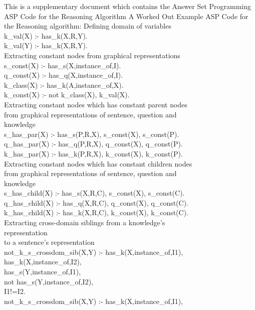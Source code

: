 \label{AppendixA}
This is a supplementary document which contains the Answer Set Programming
ASP Code for the Reasoning Algorithm
A Worked Out Example
ASP Code for the Reasoning algorithm:
Defining domain of variables\\
k\_val(X) :- has\_k(X,R,Y).\\
k\_val(Y) :- has\_k(X,R,Y).\\
Extracting constant nodes from graphical representations\\
s\_const(X) :- has\_s(X,instance\_of,I).\\
q\_const(X) :- has\_q(X,instance\_of,I).\\
k\_class(X) :- has\_k(A,instance\_of,X).\\
k\_const(X) :- not k\_class(X), k\_val(X).\\
Extracting constant nodes which has constant parent nodes\\
from graphical representations of sentence, question and\\
knowledge\\
s\_has\_par(X) :- has\_s(P,R,X), s\_const(X), s\_const(P).\\
q\_has\_par(X) :- has\_q(P,R,X), q\_const(X), q\_const(P).\\
k\_has\_par(X) :- has\_k(P,R,X), k\_const(X), k\_const(P).\\
Extracting constant nodes which has constant children nodes\\
from graphical representations of sentence, question and\\
knowledge\\
s\_has\_child(X) :- has\_s(X,R,C), s\_const(X), s\_const(C).\\
q\_has\_child(X) :- has\_q(X,R,C), q\_const(X), q\_const(C).\\
k\_has\_child(X) :- has\_k(X,R,C), k\_const(X), k\_const(C).\\ Extracting cross-domain siblings from a knowledge’s\\
representation\\
to a sentence’s representation\\
not\_k\_s\_crossdom\_sib(X,Y) :- has\_k(X,instance\_of,I1),\\
has\_k(X,instance\_of,I2),\\
has\_s(Y,instance\_of,I1),\\
not has\_s(Y,instance\_of,I2),\\
I1!=I2.\\
not\_k\_s\_crossdom\_sib(X,Y) :- has\_k(X,instance\_of,I1),  \\
